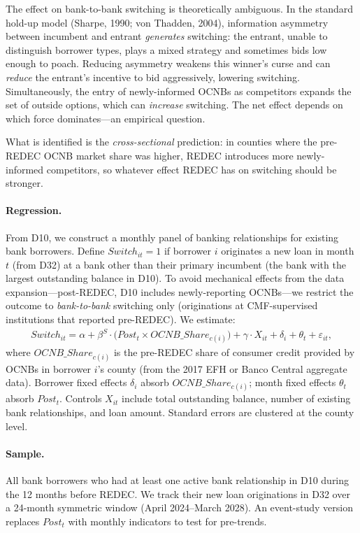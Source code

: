 \documentclass[12pt]{article}
\theoremstyle{plain}
\theoremstyle{plain}
\begin{document}
The effect on bank-to-bank switching is theoretically ambiguous. In the standard hold-up model (Sharpe, 1990; von Thadden, 2004), information asymmetry between incumbent and entrant \textit{generates} switching: the entrant, unable to distinguish borrower types, plays a mixed strategy and sometimes bids low enough to poach. Reducing asymmetry weakens this winner's curse and can \textit{reduce} the entrant's incentive to bid aggressively, lowering switching. Simultaneously, the entry of newly-informed OCNBs as competitors expands the set of outside options, which can \textit{increase} switching. The net effect depends on which force dominates---an empirical question.

What is identified is the \textit{cross-sectional} prediction: in counties where the pre-REDEC OCNB market share was higher, REDEC introduces more newly-informed competitors, so whatever effect REDEC has on switching should be stronger.

\paragraph{Regression.} From D10, we construct a monthly panel of banking relationships for existing bank borrowers. Define $Switch_{it} = 1$ if borrower $i$ originates a new loan in month $t$ (from D32) at a bank other than their primary incumbent (the bank with the largest outstanding balance in D10). To avoid mechanical effects from the data expansion---post-REDEC, D10 includes newly-reporting OCNBs---we restrict the outcome to \textit{bank-to-bank} switching only (originations at CMF-supervised institutions that reported pre-REDEC). We estimate:
\begin{align}
    Switch_{it} = \alpha + \beta^{S} \cdot \bigl(Post_t \times OCNB\_Share_{c(i)}\bigr) + \gamma \cdot X_{it} + \delta_i + \theta_t + \varepsilon_{it},
\label{eq:switch}
\end{align}
where $OCNB\_Share_{c(i)}$ is the pre-REDEC share of consumer credit provided by OCNBs in borrower $i$'s county (from the 2017 EFH or Banco Central aggregate data). Borrower fixed effects $\delta_i$ absorb $OCNB\_Share_{c(i)}$; month fixed effects $\theta_t$ absorb $Post_t$. Controls $X_{it}$ include total outstanding balance, number of existing bank relationships, and loan amount. Standard errors are clustered at the county level.

\paragraph{Sample.} All bank borrowers who had at least one active bank relationship in D10 during the 12 months before REDEC. We track their new loan originations in D32 over a 24-month symmetric window (April 2024--March 2028). An event-study version replaces $Post_t$ with monthly indicators to test for pre-trends.
\end{document}
